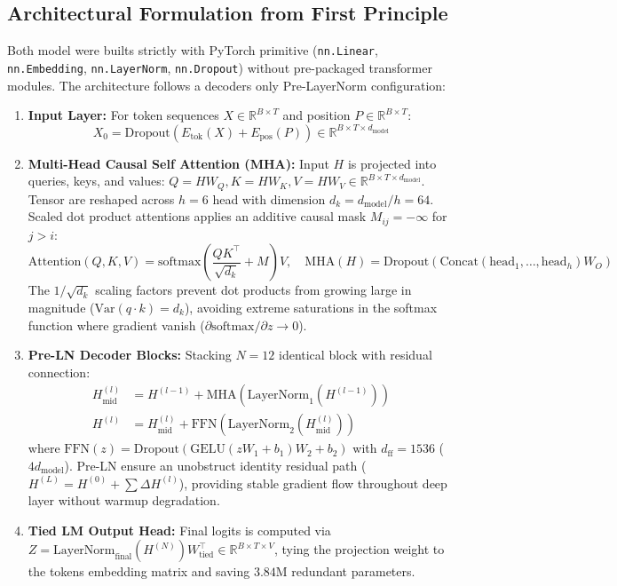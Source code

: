 \documentclass[10pt,a4paper]{article}
\begin{document}
\subsection{Architectural Formulation from First Principle}
Both model were builts strictly with PyTorch primitive (\texttt{nn.Linear}, \texttt{nn.Embedding}, \texttt{nn.LayerNorm}, \texttt{nn.Dropout}) without pre-packaged transformer modules. The architecture follows a decoders only Pre-LayerNorm configuration:
\begin{enumerate}
    \item \textbf{Input Layer:} For token sequences $X \in \mathbb{R}^{B \times T}$ and position $P \in \mathbb{R}^{B \times T}$:
    \begin{equation}
        X_0 = \text{Dropout}\left(E_{\text{tok}}(X) + E_{\text{pos}}(P)\right) \in \mathbb{R}^{B \times T \times d_{\text{model}}}
    \end{equation}
    \item \textbf{Multi-Head Causal Self Attention (MHA):} Input $H$ is projected into queries, keys, and values: $Q = H W_Q, K = H W_K, V = H W_V \in \mathbb{R}^{B \times T \times d_{\text{model}}}$. Tensor are reshaped across $h=6$ head with dimension $d_k = d_{\text{model}} / h = 64$. Scaled dot product attentions applies an additive causal mask $M_{ij} = -\infty$ for $j > i$:
    \begin{equation}
        \text{Attention}(Q, K, V) = \text{softmax}\left(\frac{Q K^\top}{\sqrt{d_k}} + M\right) V, \quad \text{MHA}(H) = \text{Dropout}\left(\text{Concat}(\text{head}_1, \dots, \text{head}_h) W_O\right)
    \end{equation}
    The $1/\sqrt{d_k}$ scaling factors prevent dot products from growing large in magnitude ($\text{Var}(q \cdot k) = d_k$), avoiding extreme saturations in the softmax function where gradient vanish ($\partial \text{softmax} / \partial z \to 0$).
    \item \textbf{Pre-LN Decoder Blocks:} Stacking $N=12$ identical block with residual connection:
    \begin{align}
        H_{\text{mid}}^{(l)} &= H^{(l-1)} + \text{MHA}\left(\text{LayerNorm}_1\left(H^{(l-1)}\right)\right) \\
        H^{(l)} &= H_{\text{mid}}^{(l)} + \text{FFN}\left(\text{LayerNorm}_2\left(H_{\text{mid}}^{(l)}\right)\right)
    \end{align}
    where $\text{FFN}(z) = \text{Dropout}\left(\text{GELU}\left(z W_1 + b_1\right) W_2 + b_2\right)$ with $d_{\text{ff}} = 1536$ ($4d_{\text{model}}$). Pre-LN ensure an unobstruct identity residual path ($H^{(L)} = H^{(0)} + \sum \Delta H^{(l)}$), providing stable gradient flow throughout deep layer without warmup degradation.
    \item \textbf{Tied LM Output Head:} Final logits is computed via $Z = \text{LayerNorm}_{\text{final}}(H^{(N)}) W_{\text{tied}}^\top \in \mathbb{R}^{B \times T \times V}$, tying the projection weight to the tokens embedding matrix and saving $3.84\text{M}$ redundant parameters.
\end{enumerate}
\end{document}
